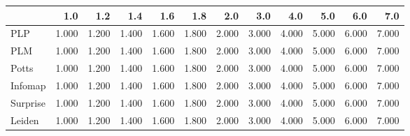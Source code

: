 \begin{tabular}{lrrrrrrrrrrr}
\toprule
{} &   1.0 &   1.2 &   1.4 &   1.6 &   1.8 &   2.0 &   3.0 &   4.0 &   5.0 &   6.0 &   7.0 \\
\midrule
PLP      & 1.000 & 1.200 & 1.400 & 1.600 & 1.800 & 2.000 & 3.000 & 4.000 & 5.000 & 6.000 & 7.000 \\
PLM      & 1.000 & 1.200 & 1.400 & 1.600 & 1.800 & 2.000 & 3.000 & 4.000 & 5.000 & 6.000 & 7.000 \\
Potts    & 1.000 & 1.200 & 1.400 & 1.600 & 1.800 & 2.000 & 3.000 & 4.000 & 5.000 & 6.000 & 7.000 \\
Infomap  & 1.000 & 1.200 & 1.400 & 1.600 & 1.800 & 2.000 & 3.000 & 4.000 & 5.000 & 6.000 & 7.000 \\
Surprise & 1.000 & 1.200 & 1.400 & 1.600 & 1.800 & 2.000 & 3.000 & 4.000 & 5.000 & 6.000 & 7.000 \\
Leiden   & 1.000 & 1.200 & 1.400 & 1.600 & 1.800 & 2.000 & 3.000 & 4.000 & 5.000 & 6.000 & 7.000 \\
\bottomrule
\end{tabular}
